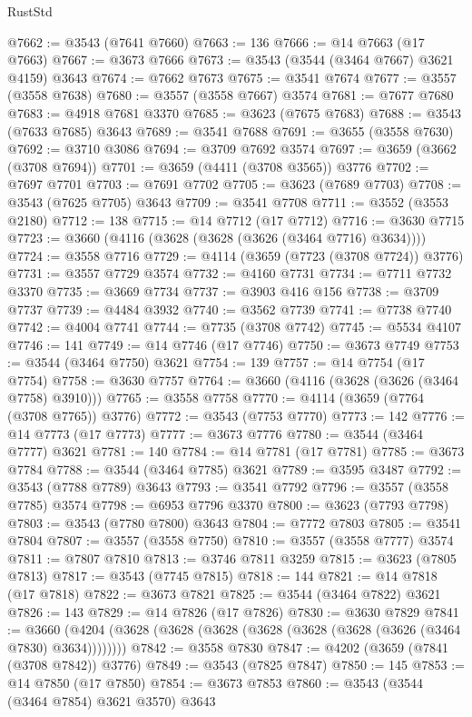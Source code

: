 \begin{lexlean}{RustStd}
\begin{coremodule}
@7662 := @3543 (@7641 @7660)
@7663 := 136
@7666 := @14 @7663 (@17 @7663)
@7667 := @3673 @7666
@7673 := @3543 (@3544 (@3464 @7667) @3621 @4159) @3643
@7674 := @7662 @7673
@7675 := @3541 @7674
@7677 := @3557 (@3558 @7638)
@7680 := @3557 (@3558 @7667) @3574
@7681 := @7677 @7680
@7683 := @4918 @7681 @3370
@7685 := @3623 (@7675 @7683)
@7688 := @3543 (@7633 @7685) @3643
@7689 := @3541 @7688
@7691 := @3655 (@3558 @7630)
@7692 := @3710 @3086
@7694 := @3709 @7692 @3574
@7697 := @3659 (@3662 (@3708 @7694))
@7701 := @3659 (@4411 (@3708 @3565)) @3776
@7702 := @7697 @7701
@7703 := @7691 @7702
@7705 := @3623 (@7689 @7703)
@7708 := @3543 (@7625 @7705) @3643
@7709 := @3541 @7708
@7711 := @3552 (@3553 @2180)
@7712 := 138
@7715 := @14 @7712 (@17 @7712)
@7716 := @3630 @7715
@7723 := @3660 (@4116 (@3628 (@3628 (@3626 (@3464 @7716) @3634))))
@7724 := @3558 @7716
@7729 := @4114 (@3659 (@7723 (@3708 @7724)) @3776)
@7731 := @3557 @7729 @3574
@7732 := @4160 @7731
@7734 := @7711 @7732 @3370
@7735 := @3669 @7734
@7737 := @3903 @416 @156
@7738 := @3709 @7737
@7739 := @4484 @3932
@7740 := @3562 @7739
@7741 := @7738 @7740
@7742 := @4004 @7741
@7744 := @7735 (@3708 @7742)
@7745 := @5534 @4107
@7746 := 141
@7749 := @14 @7746 (@17 @7746)
@7750 := @3673 @7749
@7753 := @3544 (@3464 @7750) @3621
@7754 := 139
@7757 := @14 @7754 (@17 @7754)
@7758 := @3630 @7757
@7764 := @3660 (@4116 (@3628 (@3626 (@3464 @7758) @3910)))
@7765 := @3558 @7758
@7770 := @4114 (@3659 (@7764 (@3708 @7765)) @3776)
@7772 := @3543 (@7753 @7770)
@7773 := 142
@7776 := @14 @7773 (@17 @7773)
@7777 := @3673 @7776
@7780 := @3544 (@3464 @7777) @3621
@7781 := 140
@7784 := @14 @7781 (@17 @7781)
@7785 := @3673 @7784
@7788 := @3544 (@3464 @7785) @3621
@7789 := @3595 @3487
@7792 := @3543 (@7788 @7789) @3643
@7793 := @3541 @7792
@7796 := @3557 (@3558 @7785) @3574
@7798 := @6953 @7796 @3370
@7800 := @3623 (@7793 @7798)
@7803 := @3543 (@7780 @7800) @3643
@7804 := @7772 @7803
@7805 := @3541 @7804
@7807 := @3557 (@3558 @7750)
@7810 := @3557 (@3558 @7777) @3574
@7811 := @7807 @7810
@7813 := @3746 @7811 @3259
@7815 := @3623 (@7805 @7813)
@7817 := @3543 (@7745 @7815)
@7818 := 144
@7821 := @14 @7818 (@17 @7818)
@7822 := @3673 @7821
@7825 := @3544 (@3464 @7822) @3621
@7826 := 143
@7829 := @14 @7826 (@17 @7826)
@7830 := @3630 @7829
@7841 := @3660 (@4204 (@3628 (@3628 (@3628 (@3628 (@3628 (@3628 (@3626 (@3464 @7830) @3634))))))))
@7842 := @3558 @7830
@7847 := @4202 (@3659 (@7841 (@3708 @7842)) @3776)
@7849 := @3543 (@7825 @7847)
@7850 := 145
@7853 := @14 @7850 (@17 @7850)
@7854 := @3673 @7853
@7860 := @3543 (@3544 (@3464 @7854) @3621 @3570) @3643

\end{coremodule}
\end{lexlean}
